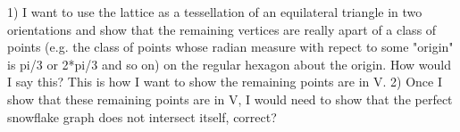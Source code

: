 


1) I want to use the lattice as a tessellation of an equilateral triangle in two orientations and show that the remaining vertices are really apart of a class of points (e.g. the class of points whose radian measure with repect to some "origin" is pi/3 or 2*pi/3 and so on) on the regular hexagon about the origin. How would I say this?  This is how I want to show the remaining points are in V.
2) Once I show that these remaining points are in V, I would need to show that the perfect snowflake graph does not intersect itself, correct?











